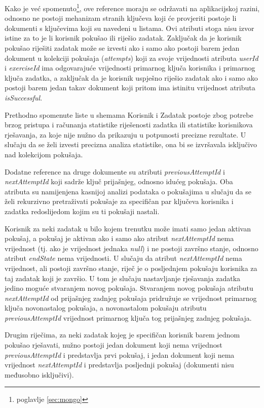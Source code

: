 \documentclass[times, utf8, diplomski, numeric]{fer}
\newcommand{\razmakp}{\vspace{18pt}}
\begin{document}
Kako je već spomenuto\footnote{poglavlje \ref{sec:mongo}}, ove reference moraju se održavati na aplikacijskoj razini, odnosno ne postoji mehanizam stranih ključeva koji će provjeriti postoje li dokumenti s ključevima koji su navedeni u listama.
Ovi atributi stoga nisu izvor istine  za to je li korisnik pokušao ili riješio zadatak.
Zaključak da je korisnik pokušao riješiti zadatak može se izvesti ako i samo ako postoji barem jedan dokument u kolekciji pokušaja (\emph{attempts}) koji za svoje vrijednosti atributa \emph{userId} i \emph{exerciseId} ima odgovarajuće vrijednosti primarnog ključa korisnika i primarnog ključa zadatka, a zaključak da je korisnik uspješno riješio zadatak ako i samo ako postoji barem jedan takav dokument koji pritom ima istinitu vrijednost atributa \emph{isSuccessful}.

Prethodno spomenute liste u shemama Korisnik i Zadatak postoje zbog potrebe brzog pristupa i računanja statistike riješenosti zadatka ili statistike korisnikova rješavanja, za koje nije nužno da prikazuju u potpunosti precizne rezultate.
U slučaju da se želi izvesti precizna analiza statistike, ona bi se izvršavala isključivo nad kolekcijom pokušaja.

\razmakp

Dodatne reference na druge dokumente su atributi \emph{previousAttemptId} i \emph{nextAttemptId} koji sadrže ključ prijašnjeg, odnosno idućeg pokušaja.
Oba atributa su namijenjena kasnijoj analizi podataka o pokušajima u slučaju da se želi rekurzivno pretraživati pokušaje za specifičan par ključeva korisnika i zadatka redoslijedom kojim su ti pokušaji nastali.

Korisnik za neki zadatak u bilo kojem trenutku može imati samo jedan aktivan pokušaj, a pokušaj je aktivan ako i samo ako atribut \emph{nextAttemptId} nema vrijednost (tj. ako je vrijednost jednaka \emph{null}) i ne postoji završno stanje, odnosno atribut \emph{endState} nema vrijednosti.
U slučaju da atribut \emph{nextAttemptId} nema vrijednost, ali postoji završno stanje, riječ je o posljednjem pokušaju korisnika za taj zadatak koji je završio.
U tom je slučaju nastavljanje rješavanja zadatka jedino moguće stvaranjem novog pokušaja.
Stvaranjem novog pokušaja atributu \emph{nextAttemptId} od prijašnjeg zadnjeg pokušaja pridružuje se vrijednost primarnog ključa novonastalog pokušaja, a novonastalom pokušaju atributu \emph{previousAttemptId} vrijednost primarnog ključa tog prijašnjeg zadnjeg pokušaja.

Drugim riječima, za neki zadatak kojeg je specifičan korisnik barem jednom pokušao rješavati, nužno postoji jedan dokument koji nema vrijednost \emph{previousAttemptId} i predstavlja prvi pokušaj, i jedan dokument koji nema vrijednost \emph{nextAttemptId} i predstavlja posljednji pokušaj (dokumenti nisu međusobno isključivi).
\end{document}
